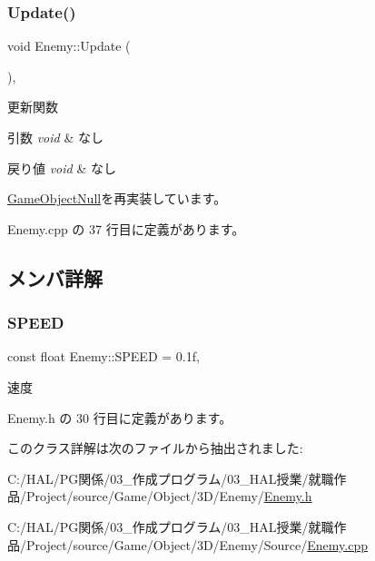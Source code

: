 \subsubsection{\texorpdfstring{Update()}{Update()}}
{\footnotesize\ttfamily void Enemy\+::\+Update (\begin{DoxyParamCaption}{ }\end{DoxyParamCaption})\hspace{0.3cm}{\ttfamily [override]}, {\ttfamily [virtual]}}



更新関数 


\begin{DoxyParams}{引数}
{\em void} & なし \\
\hline
\end{DoxyParams}

\begin{DoxyRetVals}{戻り値}
{\em void} & なし \\
\hline
\end{DoxyRetVals}


\mbox{\hyperlink{class_game_object_null_aeeb51b7e7aa41fd0b16f8f7c016bdb55}{Game\+Object\+Null}}を再実装しています。



 Enemy.\+cpp の 37 行目に定義があります。



\subsection{メンバ詳解}
\mbox{\label{class_enemy_aeed9db9b2062bfa87f2b77462dc47ba5}} 
\subsubsection{\texorpdfstring{S\+P\+E\+ED}{SPEED}}
{\footnotesize\ttfamily const float Enemy\+::\+S\+P\+E\+ED = 0.\+1f\hspace{0.3cm}{\ttfamily [static]}, {\ttfamily [private]}}



速度 



 Enemy.\+h の 30 行目に定義があります。



このクラス詳解は次のファイルから抽出されました\+:\begin{DoxyCompactItemize}
\item 
C\+:/\+H\+A\+L/\+P\+G関係/03\+\_\+作成プログラム/03\+\_\+\+H\+A\+L授業/就職作品/\+Project/source/\+Game/\+Object/3\+D/\+Enemy/\mbox{\hyperlink{_enemy_8h}{Enemy.\+h}}\item 
C\+:/\+H\+A\+L/\+P\+G関係/03\+\_\+作成プログラム/03\+\_\+\+H\+A\+L授業/就職作品/\+Project/source/\+Game/\+Object/3\+D/\+Enemy/\+Source/\mbox{\hyperlink{_enemy_8cpp}{Enemy.\+cpp}}\end{DoxyCompactItemize}
